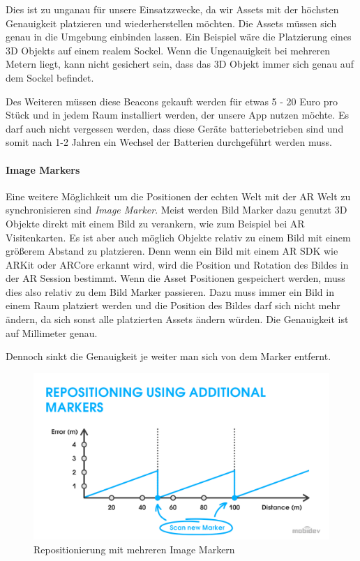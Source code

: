 \documentclass[titlepage, a4paper, 11pt]{scrartcl}
\begin{document}
  Dies ist zu unganau für unsere Einsatzzwecke, da wir Assets mit der höchsten Genauigkeit platzieren und wiederherstellen möchten. Die Assets müssen sich genau in die Umgebung einbinden lassen.
  Ein Beispiel wäre die Platzierung eines 3D Objekts auf einem realem Sockel. Wenn die Ungenauigkeit bei mehreren Metern liegt, kann nicht gesichert sein, dass das 3D Objekt immer sich genau auf dem Sockel befindet.

  Des Weiteren müssen diese Beacons gekauft werden für etwas 5 - 20 Euro pro Stück und in jedem Raum installiert werden, der unsere App nutzen möchte.
  Es darf auch nicht vergessen werden, dass diese Geräte batteriebetrieben sind und somit nach 1-2 Jahren ein Wechsel der Batterien durchgeführt werden muss. 

  \paragraph{Image Markers}

  Eine weitere Möglichkeit um die Positionen der echten Welt mit der AR Welt zu synchronisieren sind \textit{Image Marker}. Meist werden Bild Marker dazu genutzt 3D Objekte direkt mit einem Bild zu verankern, wie zum Beispiel bei AR Visitenkarten.
  Es ist aber auch möglich Objekte relativ zu einem Bild mit einem größerem Abstand zu platzieren. Denn wenn ein Bild mit einem AR SDK wie ARKit oder ARCore erkannt wird, wird die Position und Rotation des Bildes in der AR Session bestimmt.
  Wenn die Asset Positionen gespeichert werden, muss dies also relativ zu dem Bild Marker passieren. Dazu muss immer ein Bild in einem Raum platziert werden und die Position des Bildes darf sich nicht mehr ändern, da sich sonst alle platzierten Assets ändern würden.
  Die Genauigkeit ist auf Millimeter genau. \cite{HowAugme98:online}
  
  Dennoch sinkt die Genauigkeit je weiter man sich von dem Marker entfernt.

  \begin{figure}[h]
    \centering
    \includegraphics[width=.6\textwidth]{multi-marker}
    \caption{Repositionierung mit mehreren Image Markern \cite{HowAugme98:online}}
    \label{MultiMarker}
  \end{figure}
\end{document}
